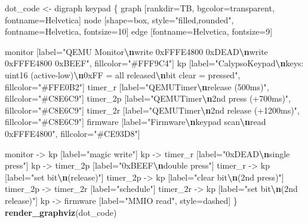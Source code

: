 \documentclass[
]{article}
\newenvironment{Shaded}{\begin{snugshade}}{\end{snugshade}}
\newcommand{\FunctionTok}[1]{\textcolor[rgb]{0.13,0.29,0.53}{\textbf{#1}}}
\newcommand{\NormalTok}[1]{#1}
\newcommand{\OtherTok}[1]{\textcolor[rgb]{0.56,0.35,0.01}{#1}}
\newcommand{\SpecialCharTok}[1]{\textcolor[rgb]{0.81,0.36,0.00}{\textbf{#1}}}
\newcommand{\StringTok}[1]{\textcolor[rgb]{0.31,0.60,0.02}{#1}}
\begin{document}
\begin{Shaded}
\begin{Highlighting}[]
\NormalTok{dot\_code }\OtherTok{\textless{}{-}} \StringTok{\textquotesingle{}digraph keypad \{}
\StringTok{  graph [rankdir=TB, bgcolor=transparent, fontname=Helvetica]}
\StringTok{  node [shape=box, style="filled,rounded", fontname=Helvetica, fontsize=10]}
\StringTok{  edge [fontname=Helvetica, fontsize=9]}

\StringTok{  monitor [label="QEMU Monitor}\SpecialCharTok{\textbackslash{}n}\StringTok{write 0xFFFE4800 0xDEAD}\SpecialCharTok{\textbackslash{}n}\StringTok{write 0xFFFE4800 0xBEEF",}
\StringTok{           fillcolor="\#FFF9C4"]}
\StringTok{  kp [label="CalypsoKeypad}\SpecialCharTok{\textbackslash{}n}\StringTok{keys: uint16 (active{-}low)}\SpecialCharTok{\textbackslash{}n}\StringTok{0xFF = all released}\SpecialCharTok{\textbackslash{}n}\StringTok{bit clear = pressed",}
\StringTok{      fillcolor="\#FFE0B2"]}
\StringTok{  timer\_r [label="QEMUTimer}\SpecialCharTok{\textbackslash{}n}\StringTok{release (500ms)", fillcolor="\#C8E6C9"]}
\StringTok{  timer\_2p [label="QEMUTimer}\SpecialCharTok{\textbackslash{}n}\StringTok{2nd press (+700ms)", fillcolor="\#C8E6C9"]}
\StringTok{  timer\_2r [label="QEMUTimer}\SpecialCharTok{\textbackslash{}n}\StringTok{2nd release (+1200ms)", fillcolor="\#C8E6C9"]}
\StringTok{  firmware [label="Firmware}\SpecialCharTok{\textbackslash{}n}\StringTok{keypad scan}\SpecialCharTok{\textbackslash{}n}\StringTok{read 0xFFFE4800", fillcolor="\#CE93D8"]}

\StringTok{  monitor {-}\textgreater{} kp [label="magic write"]}
\StringTok{  kp {-}\textgreater{} timer\_r [label="0xDEAD}\SpecialCharTok{\textbackslash{}n}\StringTok{single press"]}
\StringTok{  kp {-}\textgreater{} timer\_2p [label="0xBEEF}\SpecialCharTok{\textbackslash{}n}\StringTok{double press"]}
\StringTok{  timer\_r {-}\textgreater{} kp [label="set bit}\SpecialCharTok{\textbackslash{}n}\StringTok{(release)"]}
\StringTok{  timer\_2p {-}\textgreater{} kp [label="clear bit}\SpecialCharTok{\textbackslash{}n}\StringTok{(2nd press)"]}
\StringTok{  timer\_2p {-}\textgreater{} timer\_2r [label="schedule"]}
\StringTok{  timer\_2r {-}\textgreater{} kp [label="set bit}\SpecialCharTok{\textbackslash{}n}\StringTok{(2nd release)"]}
\StringTok{  kp {-}\textgreater{} firmware [label="MMIO read", style=dashed]}
\StringTok{\}\textquotesingle{}}
\FunctionTok{render\_graphviz}\NormalTok{(dot\_code)}
\end{Highlighting}
\end{Shaded}
\end{document}
